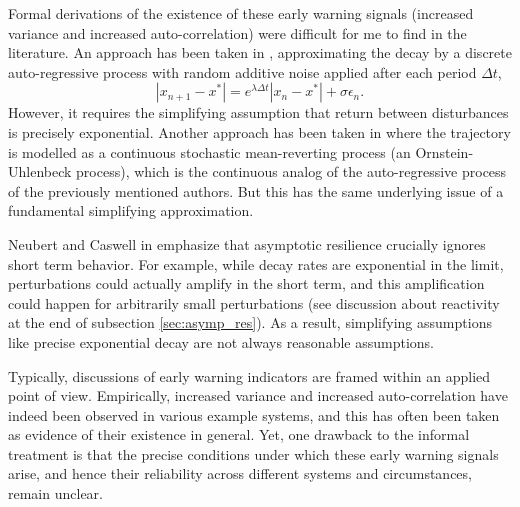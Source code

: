 Formal derivations of the existence of these early warning signals (increased variance and increased auto-correlation) were difficult for me to find in the literature. 
%
An approach has been taken in \cite{schefferCriticalTransitionsNature2009}, approximating the decay by a discrete auto-regressive process with random additive noise applied after each period $\Delta t$,
$$|x_{n+1}-x^{\ast}| = e^{\lambda \Delta t}|x_n-x^{\ast}|+\sigma\epsilon_n.$$
However, it requires the simplifying assumption that return between disturbances is precisely exponential. Another approach has been taken in \cite{ritchieEarlywarningIndicatorsDynamic2016} where the trajectory is modelled as a continuous stochastic mean-reverting process (an Ornstein-Uhlenbeck process), which is the continuous analog of the auto-regressive process of the previously mentioned authors. But this has the same underlying issue of a fundamental simplifying approximation. 

Neubert and Caswell in \cite{neubertAlternativesResilienceMeasuring1997} emphasize that asymptotic resilience crucially ignores short term behavior. For example, while decay rates are exponential in the limit, perturbations could actually amplify in the short term, and this amplification could happen for arbitrarily small perturbations (see discussion about reactivity at the end of subsection \ref{sec:asymp_res}). As a result, simplifying assumptions like precise exponential decay are not always reasonable assumptions. 

Typically, discussions of early warning indicators are framed within an applied point of view. Empirically, increased variance and increased auto-correlation have indeed been observed in various example systems, and this has often been taken as evidence of their existence in general. Yet, one drawback to the informal treatment is that the precise conditions under which these early warning signals arise, and hence their reliability across different systems and circumstances, remain unclear. 




	
